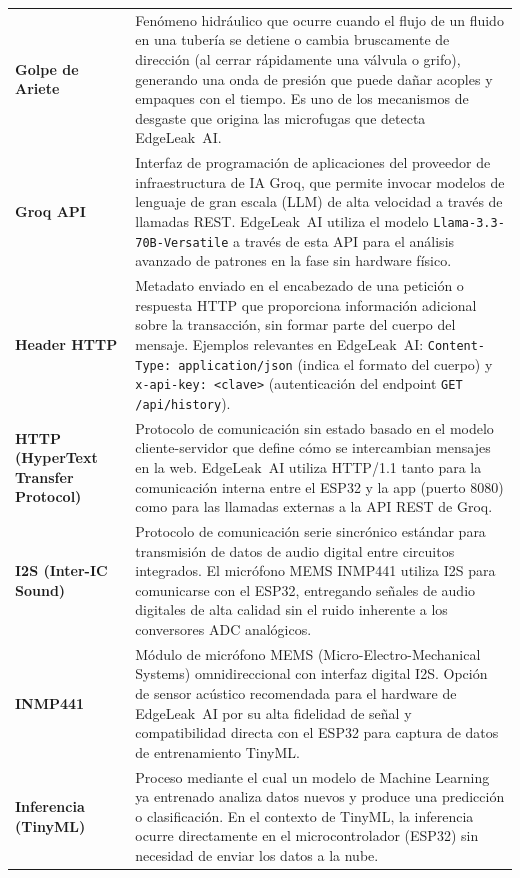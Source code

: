 \documentclass[12pt,a4paper]{article}
\begin{document}
\begin{longtable}{>{\bfseries}p{3.8cm} p{10.5cm}}
Golpe de Ariete & Fenómeno hidráulico que ocurre cuando el flujo de un fluido en una
tubería se detiene o cambia bruscamente de dirección (al cerrar rápidamente una válvula
o grifo), generando una onda de presión que puede dañar acoples y empaques con el tiempo.
Es uno de los mecanismos de desgaste que origina las microfugas que detecta EdgeLeak~AI.
\\[0.5em]

Groq API & Interfaz de programación de aplicaciones del proveedor de infraestructura de
IA Groq, que permite invocar modelos de lenguaje de gran escala (LLM) de alta velocidad
a través de llamadas REST. EdgeLeak~AI utiliza el modelo \texttt{Llama-3.3-70B-Versatile}
a través de esta API para el análisis avanzado de patrones en la fase sin hardware físico.
\\[0.5em]

Header HTTP & Metadato enviado en el encabezado de una petición o respuesta HTTP que
proporciona información adicional sobre la transacción, sin formar parte del cuerpo del
mensaje. Ejemplos relevantes en EdgeLeak~AI: \texttt{Content-Type: application/json}
(indica el formato del cuerpo) y \texttt{x-api-key: <clave>} (autenticación del
endpoint \texttt{GET /api/history}).
\\[0.5em]

HTTP (HyperText Transfer Protocol) & Protocolo de comunicación sin estado basado en el
modelo cliente-servidor que define cómo se intercambian mensajes en la web. EdgeLeak~AI
utiliza HTTP/1.1 tanto para la comunicación interna entre el ESP32 y la app (puerto 8080)
como para las llamadas externas a la API REST de Groq.
\\[0.5em]

I2S (Inter-IC Sound) & Protocolo de comunicación serie sincrónico estándar para
transmisión de datos de audio digital entre circuitos integrados. El micrófono MEMS
INMP441 utiliza I2S para comunicarse con el ESP32, entregando señales de audio digitales
de alta calidad sin el ruido inherente a los conversores ADC analógicos.
\\[0.5em]

INMP441 & Módulo de micrófono MEMS (Micro-Electro-Mechanical Systems) omnidireccional
con interfaz digital I2S. Opción de sensor acústico recomendada para el hardware de
EdgeLeak~AI por su alta fidelidad de señal y compatibilidad directa con el ESP32 para
captura de datos de entrenamiento TinyML.
\\[0.5em]

Inferencia (TinyML) & Proceso mediante el cual un modelo de Machine Learning ya entrenado
analiza datos nuevos y produce una predicción o clasificación. En el contexto de TinyML,
la inferencia ocurre directamente en el microcontrolador (ESP32) sin necesidad de enviar
los datos a la nube.
\\[0.5em]


\end{longtable}
\end{document}
